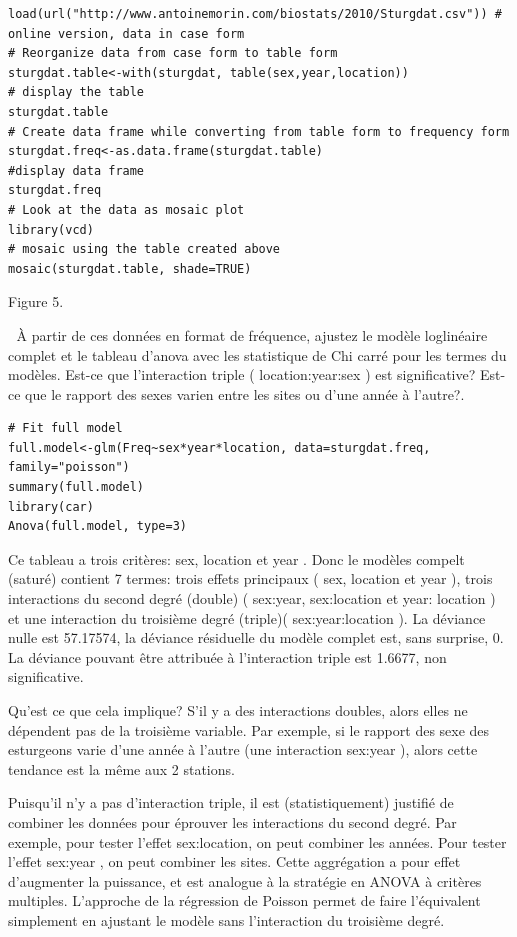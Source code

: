 \documentclass[12pt,]{book}
\begin{document}
\begin{verbatim}
load(url("http://www.antoinemorin.com/biostats/2010/Sturgdat.csv")) #
online version, data in case form
# Reorganize data from case form to table form
sturgdat.table<-with(sturgdat, table(sex,year,location))
# display the table
sturgdat.table
# Create data frame while converting from table form to frequency form
sturgdat.freq<-as.data.frame(sturgdat.table)
#display data frame
sturgdat.freq
# Look at the data as mosaic plot
library(vcd)
# mosaic using the table created above
mosaic(sturgdat.table, shade=TRUE)
\end{verbatim}

Figure 5.

 À partir de ces données en format de fréquence, ajustez le modèle loglinéaire complet et le tableau d'anova avec les statistique de Chi carré
pour les termes du modèles. Est-ce que l'interaction triple ( location:year:sex ) est significative? Est-ce que le rapport des sexes
varien entre les sites ou d'une année à l'autre?.

\begin{verbatim}
# Fit full model
full.model<-glm(Freq~sex*year*location, data=sturgdat.freq, family="poisson")
summary(full.model)
library(car)
Anova(full.model, type=3)
\end{verbatim}

Ce tableau a trois critères: sex, location et year . Donc le modèles
compelt (saturé) contient 7 termes: trois effets principaux ( sex,
location et year ), trois interactions du second degré (double)
( sex:year, sex:location et year: location ) et une interaction du
troisième degré (triple)( sex:year:location ). La déviance nulle est
57.17574, la déviance résiduelle du modèle complet est, sans surprise,
0. La déviance pouvant être attribuée à l'interaction triple est 1.6677,
non significative.

Qu'est ce que cela implique? S'il y a des interactions doubles, alors
elles ne dépendent pas de la troisième variable. Par exemple, si le
rapport des sexe des esturgeons varie d'une année à l'autre (une
interaction sex:year ), alors cette tendance est la même aux 2 stations.

Puisqu'il n'y a pas d'interaction triple, il est (statistiquement) justifié de
combiner les données pour éprouver les interactions du second degré.
Par exemple, pour tester l'effet sex:location, on peut combiner les
années. Pour tester l'effet sex:year , on peut combiner les sites. Cette
aggrégation a pour effet d'augmenter la puissance, et est analogue à la
stratégie en ANOVA à critères multiples. L'approche de la régression
de Poisson permet de faire l'équivalent simplement en ajustant le
modèle sans l'interaction du troisième degré.
\end{document}
